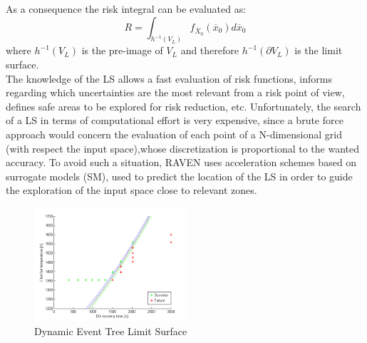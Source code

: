 \documentclass{anstrans}
\begin{document}
As a consequence the risk integral can be evaluated as:
\begin{equation} 
R=\int_{h^{-1}(V_{L})} f _{\overline{X}_{0}}(\overline{x}_{0})d\overline{x}_{0}
\end{equation}
where $h^{-1}(V_{L})$ is the pre-image of $V_{L}$ and therefore $h^{-1}(\partial V_{L})$ is the limit surface.
\\
The knowledge of the LS allows a fast evaluation of risk functions, informs regarding which uncertainties are the most relevant from a risk point of view, defines safe areas to be explored for risk reduction, etc. Unfortunately, the search of a LS in terms of computational effort is very expensive, since a brute force approach would concern the evaluation of each point of a N-dimensional grid (with respect the input space),whose discretization is proportional to the wanted accuracy.
To avoid such a situation, RAVEN uses acceleration schemes based on surrogate models (SM), used to predict the location of the LS in order to guide the exploration of the input space close to relevant zones. 

\begin{figure} 
  \centering
     \includegraphics[width=0.5\textwidth]{DET_LS_pb.png}
  \caption{Dynamic Event Tree Limit Surface}
  \label{fig:LSDET}
\end{figure}

\end{document}
